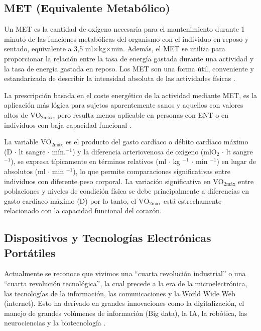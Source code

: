 \subsection{MET (Equivalente Metabólico)}
\label{subsec:met}

Un MET es la cantidad de oxígeno necesaria para el mantenimiento durante 1 minuto de las funciones metabólicas del organismo con el individuo en reposo y sentado, equivalente a 3,5 ml$\times$kg$\times$min. Además, el MET se utiliza para proporcionar la relación entre la tasa de energía gastada durante una actividad y la tasa de energía gastada en reposo. Los MET son una forma útil, conveniente y estandarizada de describir la intensidad absoluta de las actividades físicas \citep{Riebe2018ACSM}.

La prescripción basada en el coste energético de la actividad mediante MET, es la aplicación más lógica para sujetos aparentemente sanos y aquellos con valores altos de $\mathrm{VO}_{2\text{máx}}$, pero resulta menos aplicable en personas con ENT o en individuos con baja capacidad funcional \citep{Abellan2014Prescripcion}.

La variable $\mathrm{VO}_{2\text{máx}}$ es el producto del gasto cardíaco o débito cardíaco máximo (D $\cdot$ lt sangre $\cdot$ mín.$^{-1}$) y la diferencia arteriovenosa de oxígeno (mlO$_2$ $\cdot$ lt sangre $^{-1}$), se expresa típicamente en términos relativos (ml $\cdot$ kg $^{-1}$ $\cdot$ min $^{-1}$) en lugar de absolutos (ml $\cdot$ min $^{-1}$), lo que permite comparaciones significativas entre individuos con diferente peso corporal. La variación significativa en $\mathrm{VO}_{2\text{máx}}$ entre poblaciones y niveles de condición física se debe principalmente a diferencias en gasto cardiaco máximo (D) por lo tanto, el $\mathrm{VO}_{2\text{máx}}$ está estrechamente relacionado con la capacidad funcional del corazón.

\subsection{Dispositivos y Tecnologías Electrónicas Portátiles}
\label{subsec:dispositivos_wearables}

Actualmente se reconoce que vivimos una ``cuarta revolución industrial'' o una ``cuarta revolución tecnológica'', la cual precede a la era de la microelectrónica, las tecnologías de la información, las comunicaciones y la World Wide Web (internet). Esto ha derivado en grandes innovaciones como la digitalización, el manejo de grandes volúmenes de información (Big data), la IA, la robótica, las neurociencias y la biotecnología \citep{Martinez2020Revolucion}.

